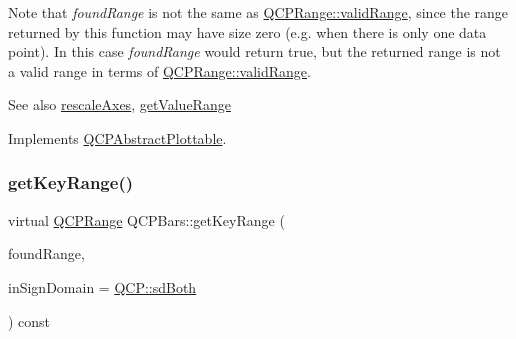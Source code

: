 Note that {\itshape found\+Range} is not the same as \hyperlink{class_q_c_p_range_ab38bd4841c77c7bb86c9eea0f142dcc0}{Q\+C\+P\+Range\+::valid\+Range}, since the range returned by this function may have size zero (e.\+g. when there is only one data point). In this case {\itshape found\+Range} would return true, but the returned range is not a valid range in terms of \hyperlink{class_q_c_p_range_ab38bd4841c77c7bb86c9eea0f142dcc0}{Q\+C\+P\+Range\+::valid\+Range}.

\begin{DoxySeeAlso}{See also}
\hyperlink{class_q_c_p_abstract_plottable_a1491c4a606bccd2d09e65e11b79eb882}{rescale\+Axes}, \hyperlink{class_q_c_p_bars_a02cee4bf94d48a1e5f6fc185d9a10477}{get\+Value\+Range} 
\end{DoxySeeAlso}


Implements \hyperlink{class_q_c_p_abstract_plottable_a4da16d3cd4b509e1104a9b0275623c96}{Q\+C\+P\+Abstract\+Plottable}.

\mbox{\label{class_q_c_p_bars_a3cc3cefe0a486f6cf5793b0bdc7b58cc}} 
\subsubsection{\texorpdfstring{get\+Key\+Range()}{getKeyRange()}\hspace{0.1cm}{\footnotesize\ttfamily [2/2]}}
{\footnotesize\ttfamily virtual \hyperlink{class_q_c_p_range}{Q\+C\+P\+Range} Q\+C\+P\+Bars\+::get\+Key\+Range (\begin{DoxyParamCaption}\item[{bool \&}]{found\+Range,  }\item[{\hyperlink{namespace_q_c_p_afd50e7cf431af385614987d8553ff8a9}{Q\+C\+P\+::\+Sign\+Domain}}]{in\+Sign\+Domain = {\ttfamily \hyperlink{namespace_q_c_p_afd50e7cf431af385614987d8553ff8a9a3dee7e9cd2fedce9253b83e172626a6c}{Q\+C\+P\+::sd\+Both}} }\end{DoxyParamCaption}) const\hspace{0.3cm}{\ttfamily [virtual]}}

